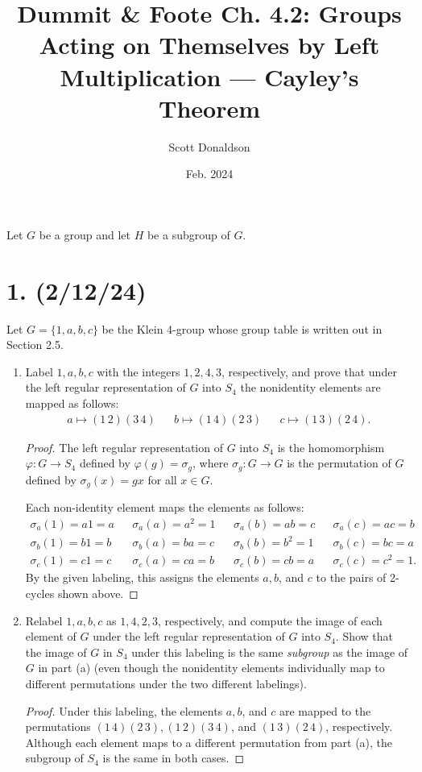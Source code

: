 \documentclass{article}
\title{Dummit \& Foote Ch. 4.2: Groups Acting on Themselves by Left Multiplication — Cayley's Theorem}
\author{Scott Donaldson}
\date{Feb. 2024}
\begin{document}
\maketitle

Let $G$ be a group and let $H$ be a subgroup of $G$.

\section*{1. (2/12/24)}

Let $G = \{ 1, a, b, c \}$ be the Klein 4-group whose group table is written out in Section 2.5.
\begin{enumerate}[label=(\alph*), itemsep=0em]
    \item Label $1, a, b, c$ with the integers $1, 2, 4, 3$, respectively, and prove that under the left regular representation of $G$ into $S_4$ the nonidentity elements are mapped as follows:
        \begin{align*}
            a \mapsto (1\, 2)(3\, 4) & & b \mapsto(1\, 4)(2\, 3) & & c \mapsto (1\, 3)(2\, 4).
        \end{align*}
        \begin{proof}
            The left regular representation of $G$ into $S_4$ is the homomorphism $\varphi: G \to S_4$ defined by $\varphi(g) = \sigma_g$, where $\sigma_g: G \to G$ is the permutation of $G$ defined by $\sigma_g(x) = gx$ for all $x \in G$.

            Each non-identity element maps the elements as follows:
            \begin{align*}
                \sigma_a(1) = a1 = a & & \sigma_a(a) = a^2 = 1 & & \sigma_a(b) = ab = c & & \sigma_a(c) = ac = b \\
                \sigma_b(1) = b1 = b & & \sigma_b(a) = ba = c & & \sigma_b(b) = b^2 = 1 & & \sigma_b(c) = bc = a \\
                \sigma_c(1) = c1 = c & & \sigma_c(a) = ca = b & & \sigma_c(b) = cb = a & & \sigma_c(c) = c^2 = 1. 
            \end{align*}
            By the given labeling, this assigns the elements $a, b$, and $c$ to the pairs of 2-cycles shown above.
        \end{proof}
    \item Relabel $1, a, b, c$ as $1, 4, 2, 3$, respectively, and compute the image of each element of $G$ under the left regular representation of $G$ into $S_4$. Show that the image of $G$ in $S_4$ under this labeling is the same \emph{subgroup} as the image of $G$ in part (a) (even though the nonidentity elements individually map to different permutations under the two different labelings).
    \begin{proof}
        Under this labeling, the elements $a, b$, and $c$ are mapped to the permutations $(1\, 4)(2\, 3), (1\, 2)(3\, 4)$, and $(1\, 3)(2\, 4)$, respectively. Although each element maps to a different permutation from part (a), the subgroup of $S_4$ is the same in both cases.
    \end{proof}
\end{enumerate}
\end{document}
